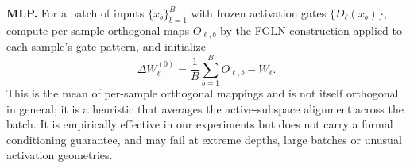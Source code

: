 \documentclass{article}
\begin{document}
\textbf{MLP.}
For a batch of inputs $\{x_b\}_{b=1}^B$ with frozen activation gates
$\{D_\ell(x_b)\}$, compute per-sample orthogonal maps $O_{\ell,b}$ by the
FGLN construction applied to each sample's gate pattern, and initialize
\begin{equation}
  \Delta W_\ell^{(0)} = \frac{1}{B}\sum_{b=1}^B O_{\ell,b} - W_\ell.
  \label{eq:warm-start-mlp}
\end{equation}
This is the mean of per-sample orthogonal mappings and is not itself
orthogonal in general; it is a heuristic that averages the active-subspace
alignment across the batch.
It is empirically effective in our experiments but does not carry a formal
conditioning guarantee, and may fail at extreme depths, large batches or unusual activation geometries.


\end{document}
